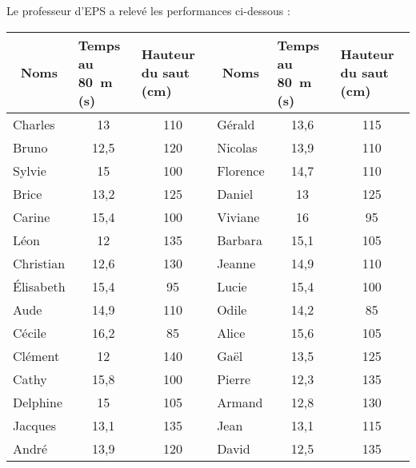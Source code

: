 
Le professeur d'EPS a relevé les performances ci-dessous :
\begin{center}
  \begin{tabularx}{0.85\linewidth}{|l|X|X|l|X|X|}
    \hline
\multicolumn{1}{|c|}{Noms}&Temps au 80~m (s)&Hauteur du saut (cm)&\multicolumn{1}{c|}{Noms}&Temps au 80~m (s)&Hauteur du saut (cm)\\
\hline
Charles&\multicolumn{1}{c|}{13}&\multicolumn{1}{c|}{110}&Gérald&\multicolumn{1}{c|}{13,6}&\multicolumn{1}{c|}{115}\\
Bruno&\multicolumn{1}{c|}{12,5}&\multicolumn{1}{c|}{120}&Nicolas&\multicolumn{1}{c|}{13,9}&\multicolumn{1}{c|}{110}\\
Sylvie&\multicolumn{1}{c|}{15}&\multicolumn{1}{c|}{100}&Florence&\multicolumn{1}{c|}{14,7}&\multicolumn{1}{c|}{110}\\
Brice&\multicolumn{1}{c|}{13,2}&\multicolumn{1}{c|}{125}&Daniel&\multicolumn{1}{c|}{13}&\multicolumn{1}{c|}{125}\\
Carine&\multicolumn{1}{c|}{15,4}&\multicolumn{1}{c|}{100}&Viviane&\multicolumn{1}{c|}{16}&\multicolumn{1}{c|}{95}\\
Léon&\multicolumn{1}{c|}{12}&\multicolumn{1}{c|}{135}&Barbara&\multicolumn{1}{c|}{15,1}&\multicolumn{1}{c|}{105}\\
Christian&\multicolumn{1}{c|}{12,6}&\multicolumn{1}{c|}{130}&Jeanne&\multicolumn{1}{c|}{14,9}&\multicolumn{1}{c|}{110}\\
\'Elisabeth&\multicolumn{1}{c|}{15,4}&\multicolumn{1}{c|}{95}&Lucie&\multicolumn{1}{c|}{15,4}&\multicolumn{1}{c|}{100}\\
Aude&\multicolumn{1}{c|}{14,9}&\multicolumn{1}{c|}{110}&Odile&\multicolumn{1}{c|}{14,2}&\multicolumn{1}{c|}{85}\\
Cécile&\multicolumn{1}{c|}{16,2}&\multicolumn{1}{c|}{85}&Alice&\multicolumn{1}{c|}{15,6}&\multicolumn{1}{c|}{105}\\
Clément&\multicolumn{1}{c|}{12}&\multicolumn{1}{c|}{140}&Gaël&\multicolumn{1}{c|}{13,5}&\multicolumn{1}{c|}{125}\\
Cathy&\multicolumn{1}{c|}{15,8}&\multicolumn{1}{c|}{100}&Pierre&\multicolumn{1}{c|}{12,3}&\multicolumn{1}{c|}{135}\\
Delphine&\multicolumn{1}{c|}{15}&\multicolumn{1}{c|}{105}&Armand&\multicolumn{1}{c|}{12,8}&\multicolumn{1}{c|}{130}\\
Jacques&\multicolumn{1}{c|}{13,1}&\multicolumn{1}{c|}{135}&Jean&\multicolumn{1}{c|}{13,1}&\multicolumn{1}{c|}{115}\\
André&\multicolumn{1}{c|}{13,9}&\multicolumn{1}{c|}{120}&David&\multicolumn{1}{c|}{12,5}&\multicolumn{1}{c|}{135}\\
\hline
  \end{tabularx}
\end{center}
